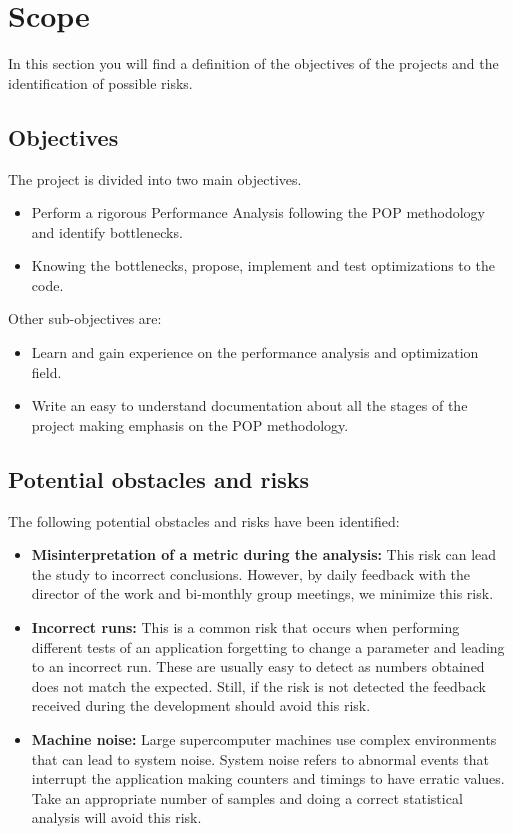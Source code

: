 \section{Scope}
\justify
In this section you will find a definition of the objectives of the projects and the identification of possible risks.
\subsection{Objectives}

\justify
The project is divided into two main objectives.
\begin{itemize}
  \item Perform a rigorous Performance Analysis following the POP methodology and identify bottlenecks.
  \item Knowing the bottlenecks, propose, implement and test optimizations to the code.
\end{itemize}

\justify
Other sub-objectives are:
\begin{itemize}
  \item Learn and gain experience on the performance analysis and optimization field.
  \item Write an easy to understand documentation about all the stages of the project making emphasis on the POP methodology.
\end{itemize}

\subsection{Potential obstacles and risks}

\justify
The following potential obstacles and risks have been identified:
\begin{itemize}
  \item \textbf{Misinterpretation of a metric during the analysis:} This risk can lead the study to incorrect conclusions. However, by daily feedback with the director of the work and bi-monthly group meetings, we minimize this risk.

  \item \textbf{Incorrect runs:} This is a common risk that occurs when performing different tests of an application forgetting to change a parameter and leading to an incorrect run. These are usually easy to detect as numbers obtained does not match the expected. Still, if the risk is not detected the feedback received during the development should avoid this risk.

  \item \textbf{Machine noise:} Large supercomputer machines use complex environments that can lead to system noise. System noise refers to abnormal events that interrupt the application making counters and timings to have erratic values. Take an appropriate number of samples and doing a correct statistical analysis will avoid this risk.
\end{itemize}

